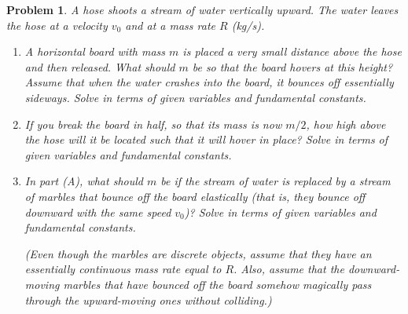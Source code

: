 \documentclass[12pt]{article}
\newcommand{\clearpts}{\addtocounter{tpts}{\value{cpts}} \setcounter{cpts}{0}}
\newcommand{\pts}[1]{\clearpts \setcounter{cpts}{#1}}
\theoremstyle{mystyle}
\newtheorem{pproblem}{Problem}
\begin{document}
\pts{10}
\begin{pproblem}
    A hose shoots a stream of water vertically upward. The water leaves the
    hose at a velocity $v_0$ and at a mass rate $R$ (kg/s).
    \begin{enumerate}[label=\Alph*)]
        \item A horizontal board with mass $m$ is placed a very small distance
        above the hose and then released. What should $m$ be so that the
        board hovers at this height? Assume that when the water crashes into
        the board, it bounces off essentially sideways. Solve in terms of given variables and fundamental constants.

        \item If you break the board in half, so that its mass is now $m/2$,
        how high above the hose will it be located such that it will
        hover in place? Solve in terms of given variables and fundamental constants.

        \item In part (A), what should $m$ be if the stream of water is
        replaced by a stream of marbles that bounce off the board elastically
        (that is, they bounce off downward with the same speed $v_0$)? Solve in terms of given variables and fundamental constants.

        (Even though the marbles are discrete objects, assume that they have
        an essentially continuous mass rate equal to $R$. Also, assume that the
        downward-moving marbles that have bounced off the board somehow
        magically pass through the upward-moving ones without colliding.)
    \end{enumerate}
\end{pproblem}
\end{document}
